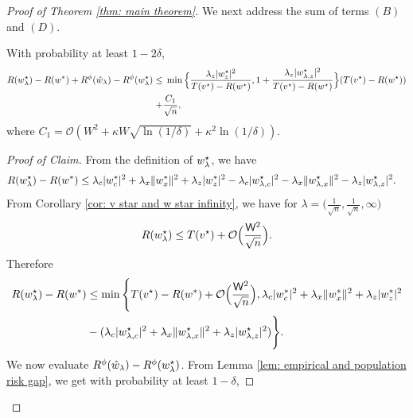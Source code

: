 \begin{proof}[Proof of Theorem \ref{thm: main theorem}]
    We next address the sum of terms $(B)$ and $(D)$.
    \begin{claim}
        With probability at least $1-2\delta$,
        \begin{equation*}
            \begin{aligned}
                R(w^\star_{\lambda})-R(w^*) + R^\phi(\hat{w}_\lambda) - R^\phi(w^\star_{\lambda})\leq &\; \min\Big\{\frac{\lambda_z|w^\star_z|^2}{T(v^\star)-R(w^\star)},1+\frac{\lambda_z|w^\star_{{\lambda,z}}|^2}{T(v^\star)-R(w^\star)}\Big\} (T(v^\star)-R(w^\star))\\
                +& \frac{C_1}{\sqrt{n}},
            \end{aligned}
        \end{equation*}
        where $C_1 = \mathcal{O}\left( W^2 + \kappa W \sqrt{\ln(1/\delta)} + \kappa^2 \ln(1/\delta) \right)$.
    \end{claim}
    \begin{proof}[Proof of Claim]
        From the definition of $w^\star_{\lambda}$, we have
        \begin{equation*}
            \begin{aligned}
                R(w^\star_{\lambda}) - R(w^*) &\leq
                \lambda_c|w^*_{c}|^2 + \lambda_x\|w^*_{x}\|^2 + \lambda_z|w^*_{z}|^2 -
                \lambda_c|w^\star_{{\lambda,c}}|^2 -\lambda_x\|w^\star_{{\lambda,x}}\|^2  -\lambda_z|w^\star_{{\lambda,z}}|^2.
            \end{aligned}
        \end{equation*}
        From Corollary \ref{cor: v star and w star infinity}, we have for $\lambda = \Big(\frac{1}{\sqrt{n}},\frac{1}{\sqrt{n}},\infty\Big)$
        \begin{equation*}
            R(w^\star_{\lambda}) \leq T(v^\star) + \mathcal{O}\Big(\frac{\mathsf{W}^2}{\sqrt{n}}\Big).
        \end{equation*}
        Therefore
        \begin{equation}\label{eqn: risk of whl minus risk of ws}
            \begin{aligned}
            R(w^\star_{\lambda}) - R(w^*) &\leq
            \min\Bigg\{
                T(v^\star)-R(w^*) + \mathcal{O}\Big(\frac{\mathsf{W}^2}{\sqrt{n}}\Big),\lambda_c|w^*_{c}|^2 + \lambda_x\|w^*_{x}\|^2 + \lambda_z|w^*_{z}|^2 \\
                &-(\lambda_c|w^\star_{{\lambda,c}}|^2 + \lambda_x\|w^\star_{{\lambda,x}}\|^2 + \lambda_z|w^\star_{{\lambda,z}}|^2)
            \Bigg\}.
            \end{aligned}
        \end{equation}
        We now evaluate $R^\phi(\hat{w}_\lambda) - R^\phi(w^\star_{\lambda})$. From Lemma \ref{lem: empirical and population risk gap}, we get with probability at least $1-\delta$,

\end{proof}
\end{proof}
